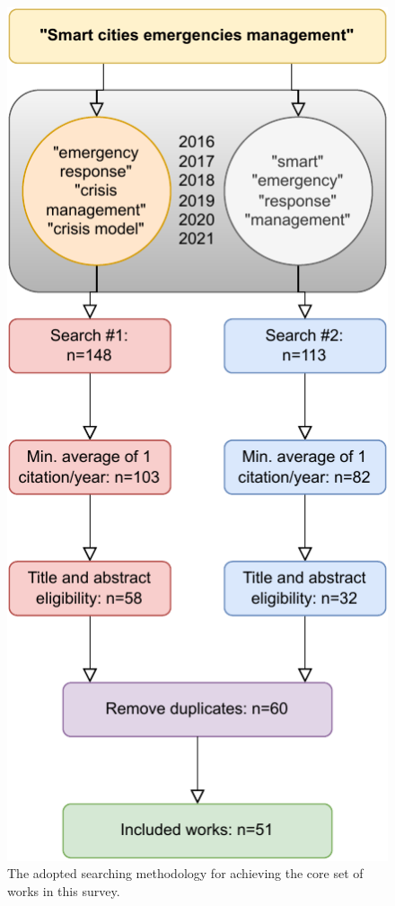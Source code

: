 \begin{refsection}
\begin{figure}[htb]
    \centering
    \includegraphics{Chapters/1-Survey/images/fluxograma.pdf}
    \caption{The adopted searching methodology for achieving the core set of works in this survey.}
    \label{fig:workflow}
\end{figure}


\end{refsection}
